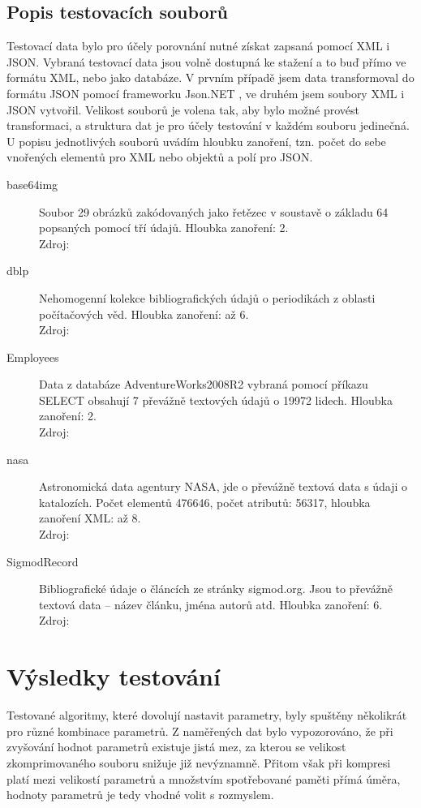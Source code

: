 \subsection{Popis testovacích souborů}
Testovací data bylo pro účely porovnání nutné získat zapsaná pomocí XML i JSON. Vybraná testovací data jsou volně dostupná ke stažení a to buď přímo ve formátu XML, nebo jako databáze. V prvním případě jsem data transformoval do formátu JSON pomocí frameworku Json.NET \cite{jsonNET}, ve druhém jsem soubory XML i JSON vytvořil. Velikost souborů je volena tak, aby bylo možné provést transformaci, a struktura dat je pro účely testování v každém souboru jedinečná. U popisu jednotlivých souborů uvádím hloubku zanoření, tzn. počet do sebe vnořených elementů pro XML nebo objektů a polí pro JSON.

\begin{description}
\item[base64img]Soubor 29 obrázků zakódovaných jako řetězec v soustavě o základu 64 popsaných pomocí tří údajů. Hloubka zanoření: 2.\\
Zdroj: %
\item[dblp]
Nehomogenní kolekce bibliografických údajů o periodikách z oblasti počítačových věd. Hloubka zanoření: až 6.\\
Zdroj: %
\item[Employees]
Data z databáze AdventureWorks2008R2 vybraná pomocí příkazu SELECT obsahují 7 převážně textových údajů o 19972 lidech. Hloubka zanoření: 2.\\
Zdroj: %
\item[nasa]
Astronomická data agentury NASA, jde o převážně textová data s údaji o katalozích. Počet elementů 476646, počet atributů: 56317, hloubka zanoření XML: až 8.\\
Zdroj: %
\item[SigmodRecord]
Bibliografické údaje o článcích ze stránky sigmod.org. Jsou to převážně textová data -- název článku, jména autorů atd. Hloubka zanoření: 6.\\
Zdroj: %
\end{description}

\section{Výsledky testování}
Testované algoritmy, které dovolují nastavit parametry, byly spuštěny několikrát pro různé kombinace parametrů. Z naměřených dat bylo vypozorováno, že při zvyšování hodnot parametrů existuje jistá mez, za kterou se velikost zkomprimovaného souboru snižuje již nevýznamně. Přitom však při kompresi platí mezi velikostí parametrů a množstvím spotřebované paměti přímá úměra, hodnoty parametrů je tedy vhodné volit s rozmyslem.

